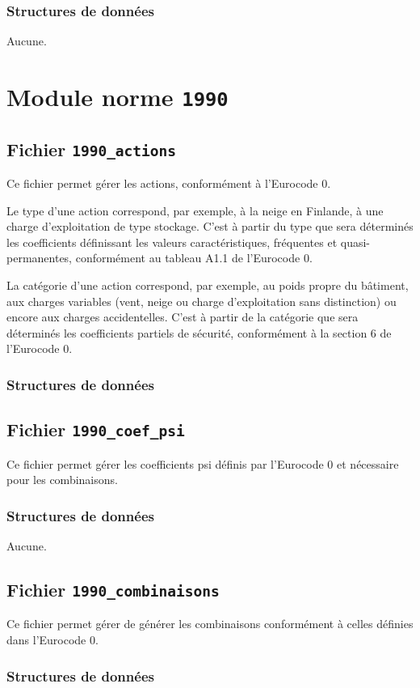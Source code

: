 \documentclass{article}
\begin{document}
\subsubsection{Structures de données}
Aucune.

\section{Module norme {\texttt{1990}}}
\subsection{Fichier {\texttt{1990\_actions}}}
Ce fichier permet gérer les actions, conformément à l'Eurocode 0.\par
Le type d'une action correspond, par exemple, à la neige en Finlande, à une charge d'exploitation de type stockage. C'est à partir du type que sera déterminés les coefficients définissant les valeurs caractéristiques, fréquentes et quasi-permanentes, conformément au tableau A1.1 de l'Eurocode 0.\par
La catégorie d'une action correspond, par exemple, au poids propre du bâtiment, aux charges variables (vent, neige ou charge d'exploitation sans distinction) ou encore aux charges accidentelles. C'est à partir de la catégorie que sera déterminés les coefficients partiels de sécurité, conformément à la section 6 de l'Eurocode 0.
\subsubsection{Structures de données}


\subsection{Fichier {\texttt{1990\_coef\_psi}}}
Ce fichier permet gérer les coefficients psi définis par l'Eurocode 0 et nécessaire pour les combinaisons.
\subsubsection{Structures de données}
Aucune.

\subsection{Fichier {\texttt{1990\_combinaisons}}}
Ce fichier permet gérer de générer les combinaisons conformément à celles définies dans l'Eurocode 0.
\subsubsection{Structures de données}


\end{document}
